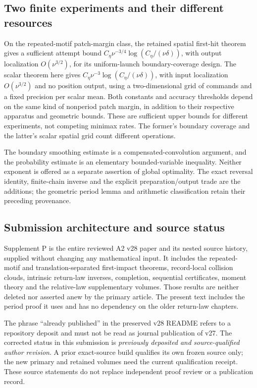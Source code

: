 \subsection{Two finite experiments and their different resources}
On the repeated-motif patch-margin class, the retained spatial first-hit
theorem gives a sufficient attempt bound
$C_\eta\nu^{-3/4}\log(C_\eta/(\nu\delta))$, with output localization
$O(\nu^{3/2})$, for its uniform-launch boundary-coverage design. The
scalar theorem here gives
$C_\eta\nu^{-3}\log(C_\eta/(\nu\delta))$, with input localization
$O(\nu^{3/2})$ and no position output, using a two-dimensional grid of
commands and a fixed precision per scalar mean. Both constants and
accuracy thresholds depend on the same kind of nonperiod patch margin,
in addition to their respective apparatus and geometric bounds. These
are sufficient upper bounds for different experiments, not competing
minimax rates. The former's boundary coverage and the latter's scalar
spatial grid count different operations.

The boundary smoothing estimate is a compensated-convolution argument,
and the probability estimate is an elementary bounded-variable inequality.
Neither exponent is offered as a separate assertion of global optimality.
The exact reversal identity, finite-chain inverse and the explicit
preparation/output trade are the additions; the geometric period lemma
and arithmetic classification retain their preceding provenance.

\subsection{Submission architecture and source status}
Supplement P is the entire reviewed A2 v28 paper and its nested source
history, supplied without changing any mathematical input. It includes
the repeated-motif and translation-separated first-impact theorems,
record-local collision clouds, intrinsic return-law inverses, completion,
sequential certificates, moment theory and the relative-law supplementary
volumes. Those results are neither deleted nor asserted anew by the
primary article. The present text includes the period proof it uses
and has no dependency on the older return-law chapters.

The phrase ``already published'' in the preserved v28 README refers to
a repository deposit and must not be read as journal publication of v27.
The corrected status in this submission is \emph{previously deposited
and source-qualified author revision}. A prior exact-source build
qualifies its own frozen source only; the new primary and retained
volumes need the current qualification receipt. These source statements
do not replace independent proof review or a publication record.

